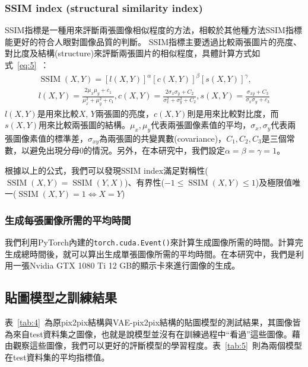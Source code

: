 \documentclass[a4paper, 12pt]{article}
\begin{document}
\subsubsection{SSIM index (structural similarity index)}
SSIM指標\cite{wang2004image}是一種用來評斷兩張圖像相似程度的方法，相較於其他種方法SSIM指標能更好的符合人眼對圖像品質的判斷。
SSIM指標主要透過比較兩張圖片的亮度、對比度及結構(structure)來評斷兩張圖片的相似程度，具體計算方式如式~\ref{eq:5}~：
\begin{equation}
    \begin{array}{l}
        \operatorname{SSIM}(X, Y)=[l(X, Y)]^{\alpha}[c(X, Y)]^{\beta}[s(X, Y)]^{\gamma}, \\
        l(X, Y)=\frac{2 \mu_{x} \mu_{y}+c_{1}}{\mu_{x}^{2}+\mu_{y}^{2}+c_{1}}, c(X, Y)=\frac{2 \sigma_{x} \sigma_{y}+C_{2}}{\sigma_{x}^{2}+\sigma_{y}^{2}+C_{2}}, s(X, Y)=\frac{\sigma_{x y}+C_{3}}{\sigma_{x} \sigma_{y}+c_{3}}
    \end{array}
    \label{eq:5}
\end{equation}
$l(X,Y)$是用來比較$X$, $Y$兩張圖的亮度，$c(X,Y)$則是用來比較對比度，而$s(X,Y)$用來比較兩張圖的結構。$\mu_x,\mu_y$代表兩張圖像素值的平均，$\sigma_x,\sigma_y$代表兩張圖像素值的標準差，$\sigma_{xy}$為兩張圖的共變異數(covariance)，$C_1,C_2,C_3$是三個常數，以避免出現分母0的情況。另外，在本研究中，我們設定$\alpha=\beta=\gamma=1$。

根據以上的公式，我們可以發現SSIM index滿足對稱性($\operatorname{SSIM}(X,Y)=\operatorname{SSIM}(Y,X)$)、有界性($-1\leq \operatorname{SSIM}(X,Y)\leq 1$)及極限值唯一($\operatorname{SSIM}(X,Y)=1 \Longleftrightarrow X=Y$)

\subsubsection{生成每張圖像所需的平均時間}

我們利用PyTorch內建的\texttt{torch.cuda.Event()}來計算生成圖像所需的時間。計算完生成總時間後，就可以算出生成單張圖像所需的平均時間。在本研究中，我們是利用一張Nvidia GTX 1080 Ti 12 GB的顯示卡來進行圖像的生成。

\subsection{貼圖模型之訓練結果}

表~\ref{tab:4}~為原pix2pix結構與VAE-pix2pix結構的貼圖模型的測試結果，其圖像皆為來自test資料集之圖像，也就是說模型並沒有在訓練過程中“看過”這些圖像。藉由觀察這些圖像，我們可以更好的評斷模型的學習程度。表~\ref{tab:5}~則為兩個模型在test資料集的平均指標值。
\end{document}
